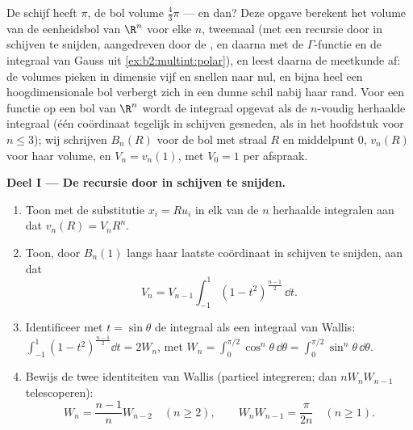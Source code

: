 \begin{problem}[{Weekendopgave --- $V_n =
\pi^{n/2}/\Gamma(\frac n2 + 1)$, en de vreemdheid van hoge
dimensies}]\label{pb:b2:multint:1}
De schijf heeft  $\pi$, de bol volume $\frac43\pi$ ---
en dan? Deze opgave berekent het volume van de eenheidsbol van
$\R^n$ voor elke $n$, tweemaal (met een recursie door in schijven
te snijden, aangedreven door de , en daarna
met de $\Gamma$-functie en de integraal van Gauss uit
\cref{ex:b2:multint:polar}), en leest daarna de meetkunde af: de
volumes pieken in dimensie vijf en snellen naar nul, en bijna heel
een hoogdimensionale bol verbergt zich in een dunne schil nabij
haar rand.
Voor een  functie op een bol van $\R^n$ wordt de integraal
opgevat als de $n$-voudig herhaalde integraal (één coördinaat
tegelijk in schijven gesneden, als in het hoofdstuk voor $n \leq
3$); wij schrijven $B_n(R)$ voor de  bol met straal $R$ en
middelpunt $0$, $v_n(R)$ voor haar volume, en $V_n = v_n(1)$, met
$V_0 = 1$ per afspraak.

\medskip
\noindent\textbf{Deel I --- De recursie door in schijven te
snijden.}
\begin{enumerate}
  \item Toon met de substitutie $x_i = Ru_i$ in elk van de $n$
        herhaalde integralen aan dat $v_n(R) = V_nR^n$.
  \item Toon, door $B_n(1)$ langs haar laatste coördinaat in
        schijven te snijden, aan dat
        \[
        V_n = V_{n-1}\int_{-1}^{1}(1 -
        t^2)^{\frac{n-1}2}\,\dd t .
        \]
  \item Identificeer met $t = \sin\theta$ de integraal als een
        integraal van Wallis: $\int_{-1}^1(1 -
        t^2)^{\frac{n-1}2}\dd t = 2W_n$, met $W_n =
        \int_0^{\pi/2}\cos^n\theta\,\dd\theta =
        \int_0^{\pi/2}\sin^n\theta\,\dd\theta$.
  \item Bewijs de twee identiteiten van Wallis (partieel
        integreren; dan $nW_nW_{n-1}$ telescoperen):
        \[
        W_n = \frac{n-1}nW_{n-2} \quad (n \geq 2),
        \qquad
        W_nW_{n-1} = \frac{\pi}{2n} \quad (n \geq 1).
        \]
\end{enumerate}


\end{problem}

